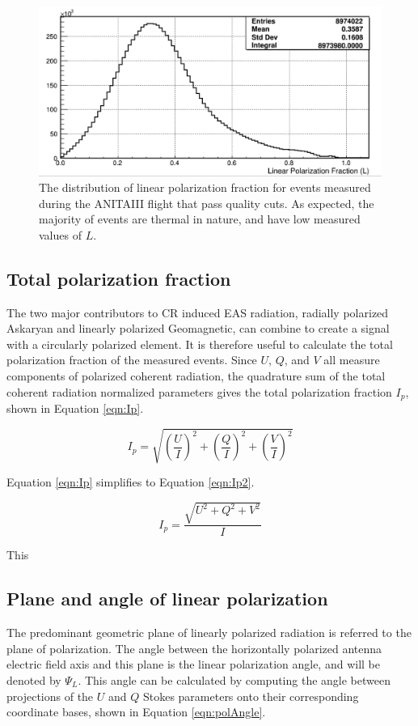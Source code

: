 	\begin{figure}
	\centering
	\includegraphics[width=\textwidth]{figures/linPolFrac_goodEvs}
	\caption{The distribution of linear polarization fraction for events measured during the ANITAIII flight that pass quality cuts.  As expected, the majority of events are thermal in nature, and have low measured values of $L$.} 
	\label{fig:LinPolFrac_goodEvs}
\end{figure}
	
	
	\subsection{Total polarization fraction}
		The two major contributors to CR induced EAS radiation, radially polarized Askaryan and linearly polarized Geomagnetic, can combine to create a signal with a circularly polarized element.  It is therefore useful to calculate the total polarization fraction of the measured events.  Since $U$, $Q$, and $V$ all measure components of polarized coherent radiation, the quadrature sum of the total coherent radiation normalized parameters gives the total polarization fraction $I_{p}$, shown in Equation \ref{eqn:Ip}.
		
	\begin{equation}
		I_p = \sqrt{(\frac{U}{I})^2 + (\frac{Q}{I})^2 + (\frac{V}{I})^2}
	\label{eqn:Ip}
	\end{equation}

		Equation \ref{eqn:Ip} simplifies to Equation \ref{eqn:Ip2}.
		
	\begin{equation}
		I_p = \frac{\sqrt{U^2 + Q^2 + V^2}}{I}
	\label{eqn:Ip2}
	\end{equation}

		This 
	\subsection{Plane and angle of linear polarization}
		The predominant geometric plane of linearly polarized radiation is referred to the plane of polarization.  The angle between the horizontally polarized antenna electric field axis and this plane is the linear polarization angle, and will be denoted by $\Psi_{L}$.  This angle can be calculated by computing the angle between projections of the $U$ and $Q$ Stokes parameters onto their corresponding coordinate bases, shown in Equation \ref{eqn:polAngle}.
	
